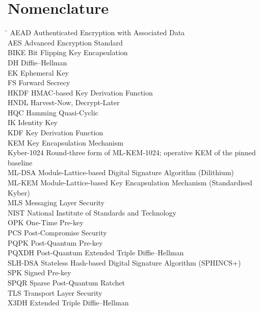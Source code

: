 \section*{Nomenclature}
\noindent
\begin{tabbing}
\hspace*{2.2cm}\=\kill
AEAD    \> Authenticated Encryption with Associated Data\\
AES     \> Advanced Encryption Standard\\
BIKE    \> Bit Flipping Key Encapsulation\\
DH      \> Diffie--Hellman\\
EK      \> Ephemeral Key\\
FS      \> Forward Secrecy\\
HKDF    \> HMAC-based Key Derivation Function\\
HNDL    \> Harvest-Now, Decrypt-Later\\
HQC     \> Hamming Quasi-Cyclic\\
IK      \> Identity Key\\
KDF     \> Key Derivation Function\\
KEM     \> Key Encapsulation Mechanism\\
Kyber-1024 \> Round-three form of ML-KEM-1024; operative KEM of the pinned baseline\\
ML-DSA  \> Module-Lattice-based Digital Signature Algorithm (Dilithium)\\
ML-KEM  \> Module-Lattice-based Key Encapsulation Mechanism (Standardised Kyber)\\
MLS     \> Messaging Layer Security\\
NIST    \> National Institute of Standards and Technology\\
OPK     \> One-Time Pre-key\\
PCS     \> Post-Compromise Security\\
PQPK    \> Post-Quantum Pre-key\\
PQXDH   \> Post-Quantum Extended Triple Diffie--Hellman\\
SLH-DSA \> Stateless Hash-based Digital Signature Algorithm (SPHINCS+)\\
SPK     \> Signed Pre-key\\
SPQR    \> Sparse Post-Quantum Ratchet\\
TLS     \> Transport Layer Security\\
X3DH    \> Extended Triple Diffie--Hellman
\end{tabbing}

